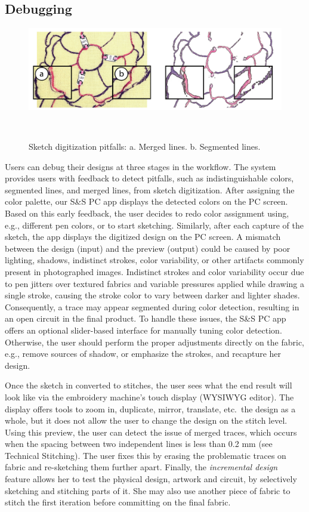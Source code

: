 \documentclass[header.tex]{subfiles}
\begin{document}
\subsection{Debugging}
\begin{figure} [t!]
\centering
  \includegraphics[width=0.9\columnwidth]{figures/Debugging.png}
  \caption{Sketch digitization pitfalls: a. Merged lines. b. Segmented lines.}~\label{fig:Debugging}
  \vspace{-2.2em}
\end{figure}
Users can debug their designs at three stages in the workflow. The system provides users with feedback to detect pitfalls, such as indistinguishable colors, segmented lines, and merged lines, from sketch digitization. After assigning the color palette, our S\&S PC app displays the detected colors on the PC screen. Based on this early feedback, the user decides to redo color assignment using, e.g., different pen colors, or to start sketching. Similarly, after each capture of the sketch, the app displays the digitized design on the PC screen. A mismatch between the design (input) and the preview (output) could be caused by poor lighting, shadows, indistinct strokes, color variability, or other artifacts commonly present in photographed images. Indistinct strokes and color variability occur due to pen jitters over textured fabrics and variable pressures applied while drawing a single stroke, causing the stroke color to vary between darker and lighter shades. Consequently, a trace may appear segmented during color detection, resulting in an open circuit in the final product. To handle these issues, the S\&S PC app offers an optional slider-based interface for manually tuning color detection. Otherwise, the user should perform the proper adjustments directly on the fabric, e.g., remove sources of shadow, or emphasize the strokes, and recapture her design. 

Once the sketch in converted to stitches, the user sees what the end result will look like via the embroidery machine's touch display (WYSIWYG editor). The display offers tools to zoom in, duplicate, mirror, translate, etc.\ the design as a whole, but it does not allow the user to change the design on the stitch level. Using this preview, the user can detect the issue of merged traces, which occurs when the spacing between two independent lines is less than 0.2 mm (see Technical Stitching). The user fixes this by erasing the problematic traces on fabric and re-sketching them further apart. Finally, the \textit{incremental design} feature allows her to test the physical design, artwork and circuit, by selectively sketching and stitching parts of it. She may also use another piece of fabric to stitch the first iteration before committing on the final fabric.
\end{document}

